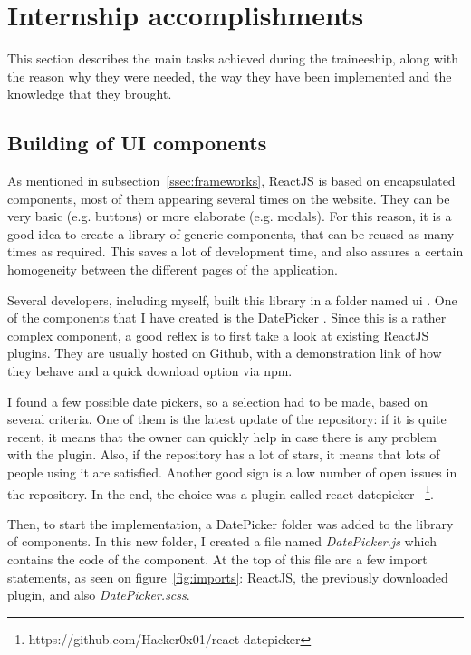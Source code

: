 \section{Internship accomplishments}
\label{sec:accomplish}

This section describes the main tasks achieved during the traineeship, along with the reason why they were needed, the way they have been implemented and the knowledge that they brought.

\subsection{Building of UI components}
\label{ssec:ui_components}

As mentioned in {\sc subsection}~\ref{ssec:frameworks}, ReactJS is based on encapsulated components, most of them appearing several times on the website. They can be very basic (e.g. buttons) or more elaborate (e.g. modals). For this reason, it is a good idea to create a library of generic components, that can be reused as many times as required. This saves a lot of development time, and also assures a certain homogeneity between the different pages of the application.

Several developers, including myself, built this library in a folder named \guillemotleft{} ui \guillemotright{}. One of the components that I have created is the \guillemotleft{} DatePicker \guillemotright{}. Since this is a rather complex component, a good reflex is to first take a look at existing ReactJS plugins. They are usually hosted on Github, with a demonstration link of how they behave and a quick download option via npm.

I found a few possible date pickers, so a selection had to be made, based on several criteria. One of them is the latest update of the repository: if it is quite recent, it means that the owner can quickly help in case there is any problem with the plugin. Also, if the repository has a lot of stars, it means that lots of people using it are satisfied. Another good sign is a low number of open issues in the repository. In the end, the choice was a plugin called \guillemotleft{} react-datepicker \guillemotright{}~\footnote{https://github.com/Hacker0x01/react-datepicker}.

Then, to start the implementation, a \guillemotleft{} DatePicker \guillemotright{} folder was added to the library of components. In this new folder, I created a file named \textit{DatePicker.js} which contains the code of the component. At the top of this file are a few \guillemotleft{} import \guillemotright{} statements, as seen on {\sc figure}~\ref{fig:imports}: ReactJS, the previously downloaded plugin, and also \textit{DatePicker.scss}.

